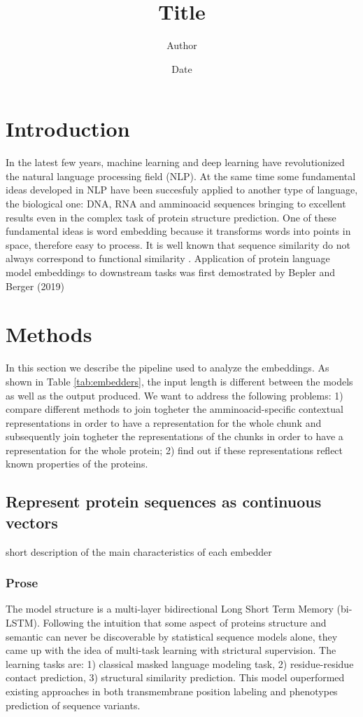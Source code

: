 \documentclass[12pt, letterpaper, twocolumn]{article}
\title{Title}
\author{Author}
\date{Date}
\begin{document}
\maketitle


\section{Introduction}
In the latest few years, machine learning and deep learning have revolutionized the natural language processing field (NLP)\cite{khurana2023natural}. At the same time some fundamental ideas developed in NLP have been succesfuly applied to another type of language, the biological one: DNA, RNA and amminoacid sequences bringing to excellent results even in the complex task of protein structure prediction\cite{jumper2021highly, lin2022language}. One of these fundamental ideas is word embedding \cite{mikolov2013efficient} because it transforms words into points in space, therefore easy to process.
It is well known that sequence similarity do not always correspond to functional similarity \cite{kosloff2008sequence}.
Application of protein language model embeddings to downstream tasks was first demostrated by Bepler and Berger (2019) \cite{bepler2019learning}

\section{Methods}

In this section we describe the pipeline used to analyze the embeddings. As shown in Table \ref{tab:embedders}, the input length is different between the models as well as the output produced. We want to address the following problems: 1) compare different methods to join togheter the amminoacid-specific contextual representations in order to have a representation for the whole chunk and subsequently join togheter the representations of the chunks in order to have a representation for the whole protein; 2) find out if these representations reflect known properties of the proteins.

\subsection{Represent protein sequences as continuous vectors}
short description of the main characteristics of each embedder

\subsubsection{Prose \cite{bepler2021learning}}
The model structure is a multi-layer bidirectional Long Short Term Memory (bi-LSTM). Following the intuition that some aspect of proteins structure and semantic can never be discoverable by statistical sequence models alone, they came up with the idea of multi-task learning with strictural supervision. The learning tasks are: 1) classical masked language modeling task, 2) residue-residue contact prediction, 3) structural similarity prediction. This model ouperformed existing approaches in both transmembrane position labeling and phenotypes prediction of sequence variants.
\end{document}
